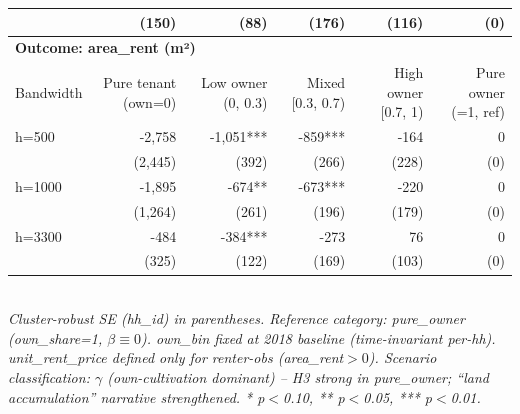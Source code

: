 \begin{table}[t]
\begin{tabular}{lrrrrr}
    & (150) & (88) & (176) & (116) & (0) \\
\midrule
\multicolumn{6}{l}{\textbf{Outcome: area\_rent (m²)}} \\
Bandwidth & Pure tenant (own=0) & Low owner (0, 0.3) & Mixed [0.3, 0.7) & High owner [0.7, 1) & Pure owner (=1, ref) \\
\midrule
h=500 & -2,758 & -1,051*** & -859*** & -164 & 0 \\
    & (2,445) & (392) & (266) & (228) & (0) \\
h=1000 & -1,895 & -674** & -673*** & -220 & 0 \\
    & (1,264) & (261) & (196) & (179) & (0) \\
h=3300 & -484 & -384*** & -273 & 76 & 0 \\
    & (325) & (122) & (169) & (103) & (0) \\
\midrule
\bottomrule
\end{tabular}
\\
\footnotesize\textit{Cluster-robust SE (hh\_id) in parentheses. Reference category: pure\_owner (own\_share=1, $\beta \equiv 0$). own\_bin fixed at 2018 baseline (time-invariant per-hh). unit\_rent\_price defined only for renter-obs (area\_rent$>0$). Scenario classification: $\gamma$ (own-cultivation dominant) -- H3 strong in pure\_owner; ``land accumulation'' narrative strengthened. * p$<$0.10, ** p$<$0.05, *** p$<$0.01.}
\end{table}


